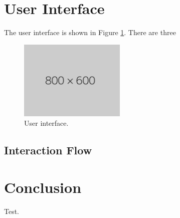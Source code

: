 \documentclass[submit,techrep,english]{ipsj}
\begin{document}
\section{User Interface}
\label{sec:user-interface}
The user interface is shown in Figure \ref{fig:user-interface}. There are three

\begin{figure}[t]
    \centering
    \includegraphics[width=0.45\textwidth]{figures/800x600px.png}
    \caption{User interface.}
    \label{fig:user-interface}
\end{figure}

\subsection{Interaction Flow}
\label{subsec:interaction-flow}

\section{Conclusion}

\begin{acknowledgment}
    Test.
\end{acknowledgment}




\appendix
\end{document}
